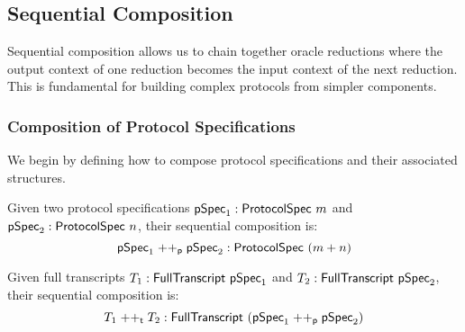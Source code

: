



\subsection{Sequential Composition}\label{sec:sequential_composition}

Sequential composition allows us to chain together oracle reductions where the output context of one reduction becomes the input context of the next reduction. This is fundamental for building complex protocols from simpler components.

\subsubsection{Composition of Protocol Specifications}

We begin by defining how to compose protocol specifications and their associated structures.

\begin{definition}
    \label{def:protocol_spec_append}
    Given two protocol specifications $\pSpec_1 : \ProtocolSpec\ m$ and $\pSpec_2 : \ProtocolSpec\ n$, their sequential composition is:
    \[ \mathsf{pSpec}_1 \mathrel{++_\mathsf{p}} \mathsf{pSpec}_2 : \mathsf{ProtocolSpec}\ (m + n) \]
\end{definition}

\begin{definition}
    \label{def:transcript_append}
    Given full transcripts $T_1 : \mathsf{FullTranscript}\ \mathsf{pSpec}_1$ and $T_2 : \mathsf{FullTranscript}\ \mathsf{pSpec}_2$, their sequential composition is:
    \[ T_1 \mathrel{++_\mathsf{t}} T_2 : \mathsf{FullTranscript}\ (\mathsf{pSpec}_1 \mathrel{++_\mathsf{p}} \mathsf{pSpec}_2) \]
\end{definition}

